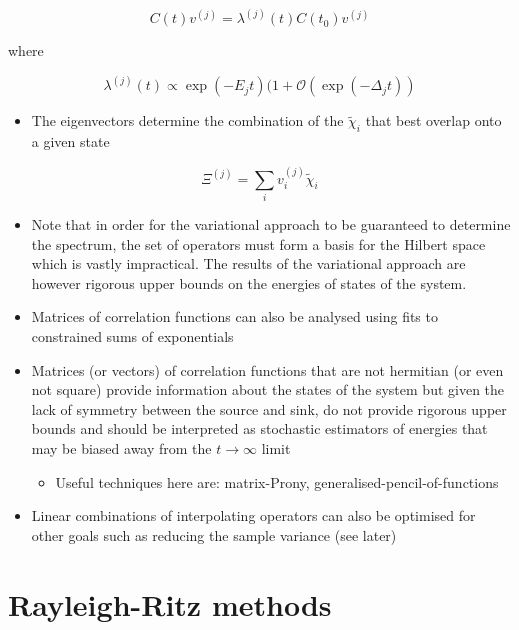 \begin{equation}
C(t) v^{(j)}=\lambda^{(j)}(t) C\left(t_{0}\right) v^{(j)}
\end{equation}

where

\begin{equation}
\lambda^{(j)}(t) \propto \exp \left(-E_{j} t\right)(1+\mathcal{O}(\exp (-\Delta_j t))
\end{equation}

\begin{itemize}
    \item The eigenvectors determine the combination of the $\tilde{\chi}_i$ that best overlap onto a given state
\end{itemize}
\begin{equation}
    \Xi^{(j)} = \sum_i v_i^{(j)}\tilde{\chi}_i
\end{equation}
\begin{itemize}
    \item Note that in order for the variational approach to be guaranteed to determine the spectrum, the set of operators must form a basis for the Hilbert space which is vastly impractical. The results of the variational approach are however rigorous upper bounds on the energies of states of the system.
    \item Matrices of correlation functions can also be analysed using fits to constrained sums of exponentials
    \item Matrices (or vectors) of correlation functions that are not hermitian (or even not square) provide information about the states of the system but given the lack of symmetry between the source and sink, do not provide rigorous upper bounds and should be interpreted as stochastic estimators of energies that may be biased away from the $t \rightarrow \infty$ limit
    \begin{itemize}
        \item Useful techniques here are: matrix-Prony, generalised-pencil-of-functions
    \end{itemize}
    \item Linear combinations of interpolating operators can also be optimised for other goals such as reducing the sample variance (see later)
\end{itemize}

\section{Rayleigh-Ritz methods}

